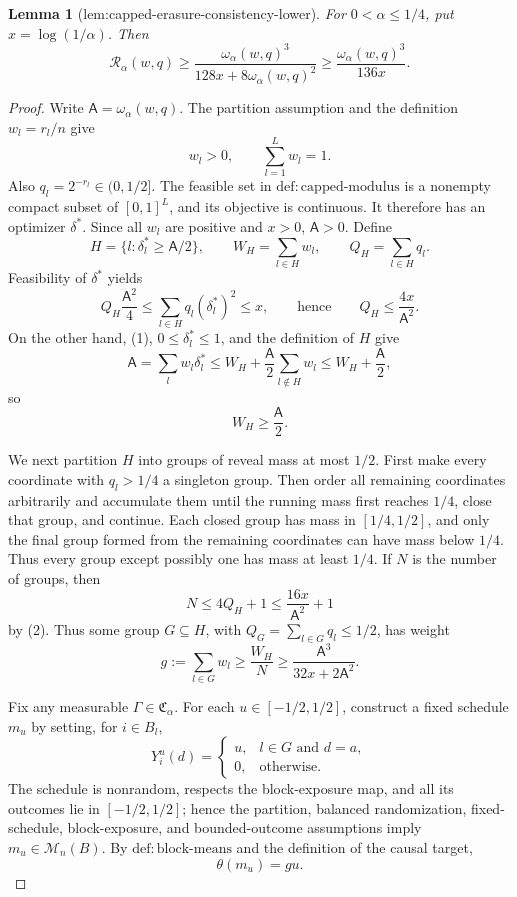 \documentclass{article}
\newtheorem{lemma}{Lemma}
\begin{document}
\begin{lemma}[lem:capped-erasure-consistency-lower]\label{lem:capped-erasure-consistency-lower}
For \(0<\alpha\le 1/4\), put \(x=\log(1/\alpha)\).  Then
\[
 \mathcal R_\alpha(w,q)
 \ge
 \frac{\omega_\alpha(w,q)^3}
      {128x+8\omega_\alpha(w,q)^2}
 \ge
 \frac{\omega_\alpha(w,q)^3}{136x}.
\]
\end{lemma}
\begin{proof}
Write \(\mathsf A=\omega_\alpha(w,q)\).  The partition assumption and
the definition \(w_l=r_l/n\) give
\[
 w_l>0,\qquad \sum_{l=1}^Lw_l=1.
\tag{1}
\]
Also \(q_l=2^{-r_l}\in(0,1/2]\).  The feasible set in
\(\mathrm{def{:}capped\text{-}modulus}\) is a nonempty compact subset
of \([0,1]^L\), and its objective is continuous.  It therefore has an
optimizer \(\delta^*\).  Since all \(w_l\) are positive and \(x>0\),
\(\mathsf A>0\).  Define
\[
 H=\{l:\delta_l^*\ge \mathsf A/2\},
 \qquad W_H=\sum_{l\in H}w_l,
 \qquad Q_H=\sum_{l\in H}q_l.
\]
Feasibility of \(\delta^*\) yields
\[
 Q_H\frac{\mathsf A^2}{4}
 \le \sum_{l\in H}q_l(\delta_l^*)^2
 \le x,
 \qquad \text{hence}\qquad
 Q_H\le \frac{4x}{\mathsf A^2}.
\tag{2}
\]
On the other hand, (1), \(0\le\delta_l^*\le1\), and the definition of
\(H\) give
\[
 \mathsf A=\sum_lw_l\delta_l^*
 \le W_H+\frac{\mathsf A}{2}\sum_{l\notin H}w_l
 \le W_H+\frac{\mathsf A}{2},
\]
so
\[
 W_H\ge \frac{\mathsf A}{2}.
\tag{3}
\]

We next partition \(H\) into groups of reveal mass at most \(1/2\).
First make every coordinate with \(q_l>1/4\) a singleton group.  Then
order all remaining coordinates arbitrarily and accumulate them until
the running mass first reaches \(1/4\), close that group, and continue.
Each closed group has mass in \([1/4,1/2]\), and only the final group
formed from the remaining coordinates can have mass below \(1/4\).
Thus every group except possibly one has mass at least \(1/4\).  If
\(N\) is the number of groups, then
\[
 N\le4Q_H+1\le\frac{16x}{\mathsf A^2}+1
\tag{4}
\]
by (2).  Thus some group \(G\subseteq H\), with
\(Q_G=\sum_{l\in G}q_l\le1/2\), has weight
\[
 g:=\sum_{l\in G}w_l
 \ge\frac{W_H}{N}
 \ge\frac{\mathsf A^3}{32x+2\mathsf A^2}.
\tag{5}
\]

Fix any measurable \(\Gamma\in\mathfrak C_\alpha\).  For each
\(u\in[-1/2,1/2]\), construct a fixed schedule \(m_u\) by setting, for
\(i\in B_l\),
\[
 Y_i^u(d)=
 \begin{cases}
 u,&l\in G\text{ and }d=a,\\
 0,&\text{otherwise}.
 \end{cases}
\tag{6}
\]
The schedule is nonrandom, respects the block-exposure map, and all
its outcomes lie in \([-1/2,1/2]\); hence the partition, balanced
randomization, fixed-schedule, block-exposure, and bounded-outcome
assumptions imply \(m_u\in\mathcal M_n(B)\).  By
\(\mathrm{def{:}block\text{-}means}\) and the definition of the causal
target,
\[
 \theta(m_u)=gu.
\tag{7}
\]


\end{proof}
\end{document}
